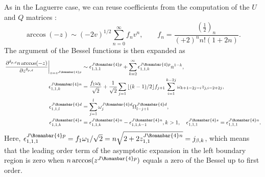 \documentclass[11pt]{article}
\newcommand{\qj}{J}
\newcommand{\rl}{{\scriptsize \Romanbar{4}} }
\newcommand{\pg}{p}
\newcommand{\pn}{n}
\newcommand{\pd}{d}
\newcommand{\ps}{s}
\numberwithin{equation}{section}
\begin{document}
As in the Laguerre case, we can reuse coefficients from the computation of the $U$ and $Q$ matrices \cite[(40)]{jacobi}:
\begin{equation}%
	\arccos(-z) \sim (-2v)^{1/2}\sum_{n=0}^{\infty} f_n v^n, \qquad f_n=\frac{(\frac 12)_n }{(+ 2)^{n}n!(1+2n)}. %
\end{equation}
The argument of the Bessel functions is then expanded as
\begin{align}
	\left. \frac{\partial^{\delta_{\pg,\pd} } n \arccos(-z) }{ \partial z^{\delta_{\pg,\pd} } } \right|_{ z=z^{\qj\rl\pg} } & \sim \epsilon_{1,1,1}^{\qj\rl\pg} + \sum_{k=2}^\infty \epsilon_{1,1,k}^{\qj\rl\pg} n^{1-k}, \\ 
	\epsilon_{1,1,k}^{\qj\rl\pn} & = \frac{f_1 \omega_k}{\sqrt{2}} + \frac{1}{\sqrt{2}} \sum_{j=1}{\lfloor (k-1)/2 \rfloor} f_{j+1} \sum_{i=1}^{k-2j} \omega_{k+1-2j-i} z_{j,i-2+2j}, \\
	\epsilon_{1,1,l}^{\qj\rl\pd} & = \sum_{j=1}^l \omega_j^{\qj\rl\pd} \Omega_{l-j+1}^{\qj\rl\pd}, \\
	\epsilon_{1,1,k}^{\qj\rl\ps} & = \epsilon_{1,1,k}^{\qj\rl\pn} - \epsilon_{1,1,k-1}^{\qj\rl\pn}, k > 1, \quad \epsilon_{1,1,1}^{\qj\rl\ps} = \epsilon_{1,1,1}^{\qj\rl\pn}.
\end{align} %
Here, $\epsilon_{1,1,1}^{\qj\rl\pg} =  f_1\omega_1/\sqrt{2} = n\sqrt{2+2z_{1,1}^{\qj\rl\pn}} = j_{\beta,k}$, which means that the leading order term of the asymptotic expansion in the left boundary region is zero when $n\arccos(z^{\qj\rl\pg})$ equals a zero of the Bessel up to first order. 
\end{document}
